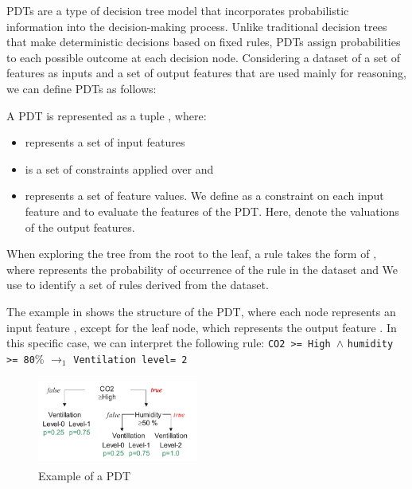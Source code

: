 PDTs \cite{Wei2022} are a type of decision tree model that incorporates probabilistic information into the decision-making process. Unlike traditional decision trees that make deterministic decisions based on fixed rules, PDTs assign probabilities to each possible outcome at each decision node. Considering a dataset of a set of features as inputs  and a set of output features  that are used mainly for reasoning, we can define PDTs as follows: 



\begin{mydef} A PDT is represented as a tuple , where:  
 \begin{itemize}
\item {}  represents a set of input features 
\item {} is a set of constraints applied over   and 
\item {} represents a set of feature values. We define  as a constraint on each input feature   and  to evaluate the features of the PDT. Here,  denote the valuations of the output features. 
 \end{itemize}
When exploring the tree from the root to the leaf, a rule takes the form of , where \emath{\lambda} represents the probability of occurrence of the rule in the dataset and  We use  to identify a set of rules derived from the dataset.
\end{mydef}


The example in  shows the structure of the PDT, where each node represents an input feature , except for the leaf node, which represents the output feature . In this specific case, we can interpret the following rule: \texttt{CO2 >= High }$\wedge$ \texttt{humidity >= 80}\% $\rightarrow_{1}$ \texttt{Ventilation level= 2}
\noindent
\begin{figure}[!htb]
    \centering
    \includegraphics[width=150pt, height =82pt]{decisiontreeexample.pdf}
    \caption{Example of a PDT}
    \label{fig:pdt}
\end{figure} 

